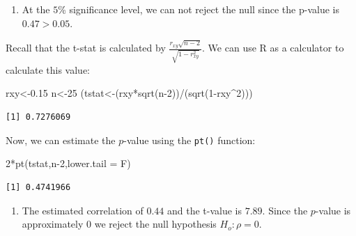 \documentclass[
  letterpaper,
  DIV=11,
  numbers=noendperiod]{scrreprt}
\newenvironment{Shaded}{\begin{snugshade}}{\end{snugshade}}
\newcommand{\AttributeTok}[1]{\textcolor[rgb]{0.40,0.45,0.13}{#1}}
\newcommand{\DecValTok}[1]{\textcolor[rgb]{0.68,0.00,0.00}{#1}}
\newcommand{\FloatTok}[1]{\textcolor[rgb]{0.68,0.00,0.00}{#1}}
\newcommand{\FunctionTok}[1]{\textcolor[rgb]{0.28,0.35,0.67}{#1}}
\newcommand{\NormalTok}[1]{\textcolor[rgb]{0.00,0.23,0.31}{#1}}
\newcommand{\OtherTok}[1]{\textcolor[rgb]{0.00,0.23,0.31}{#1}}
\newcommand{\SpecialCharTok}[1]{\textcolor[rgb]{0.37,0.37,0.37}{#1}}
\providecommand{\tightlist}{%
  \setlength{\itemsep}{0pt}\setlength{\parskip}{0pt}}\usepackage{longtable,booktabs,array}
\begin{document}
\begin{blackbox}

\begin{enumerate}
\def\labelenumi{\arabic{enumi}.}
\tightlist
\item
  At the \(5\)\% significance level, we can not reject the null since
  the p-value is \(0.47>0.05\).
\end{enumerate}

\end{blackbox}

Recall that the t-stat is calculated by
\(\frac {r_{xy}\sqrt{n-2}}{\sqrt{1-r_{xy}^2}}\). We can use R as a
calculator to calculate this value:

\begin{Shaded}
\begin{Highlighting}[numbers=left,,]
\NormalTok{rxy}\OtherTok{\textless{}{-}}\FloatTok{0.15}
\NormalTok{n}\OtherTok{\textless{}{-}}\DecValTok{25}
\NormalTok{(tstat}\OtherTok{\textless{}{-}}\NormalTok{(rxy}\SpecialCharTok{*}\FunctionTok{sqrt}\NormalTok{(n}\DecValTok{{-}2}\NormalTok{))}\SpecialCharTok{/}\NormalTok{(}\FunctionTok{sqrt}\NormalTok{(}\DecValTok{1}\SpecialCharTok{{-}}\NormalTok{rxy}\SpecialCharTok{\^{}}\DecValTok{2}\NormalTok{)))}
\end{Highlighting}
\end{Shaded}

\begin{verbatim}
[1] 0.7276069
\end{verbatim}

Now, we can estimate the \(p\)-value using the \texttt{pt()} function:

\begin{Shaded}
\begin{Highlighting}[numbers=left,,]
\DecValTok{2}\SpecialCharTok{*}\FunctionTok{pt}\NormalTok{(tstat,n}\DecValTok{{-}2}\NormalTok{,}\AttributeTok{lower.tail =}\NormalTok{ F)}
\end{Highlighting}
\end{Shaded}

\begin{verbatim}
[1] 0.4741966
\end{verbatim}

\begin{blackbox}

\begin{enumerate}
\def\labelenumi{\arabic{enumi}.}
\setcounter{enumi}{1}
\tightlist
\item
  The estimated correlation of \(0.44\) and the t-value is \(7.89\).
  Since the \(p\)-value is approximately \(0\) we reject the null
  hypothesis \(H_{o}: \rho=0\).
\end{enumerate}

\end{blackbox}
\end{document}
